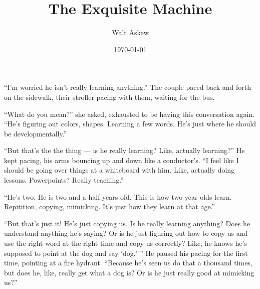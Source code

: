 \documentclass[12pt, oneside]{memoir}
\title{The Exquisite Machine}
\author{Walt Askew}
\date{\today}
\begin{document}
\maketitle

``I'm worried he isn't really learning anything.''
The couple paced back and forth on the sidewalk,
their stroller pacing with them, waiting for the bus.

``What do you mean?'' she asked, exhausted to be having this conversation
again.
``He's figuring out colors, shapes.
Learning a few words.
He's just where he should be developmentally.''

``But that's the the thing --- is he really learning?
Like, actually learning?''
He kept pacing, his arms bouncing up and down like a conductor's.
``I feel like I should be going over things at a whiteboard with him.
Like, actually doing lessons.
Powerpoints?
Really teaching.''

``He's two.
He is two and a half years old.
This is how two year olds learn.
Repitition, copying, mimicking.
It's just how they learn at that age.''

``But that's just it!
He's just copying us.
Is he really learning anything?
Does he understand anything he's saying?
Or is he just figuring out how to copy us and use the right word at
the right time and copy us correctly?
Like, he knows he's supposed to point at the dog and say `dog,' ''
He paused his pacing for the first time, pointing at a fire hydrant.
``Because he's seen us do that a thousand times, but does he, like, really get
what a dog is?
Or is he just really good at mimicking us?''
\end{document}
